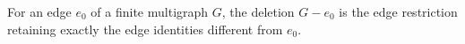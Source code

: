 \begin{definition}
For an edge $e_0$ of a finite multigraph $G$, the deletion $G-e_0$ is the
edge restriction retaining exactly the edge identities different from
$e_0$.
\end{definition}
